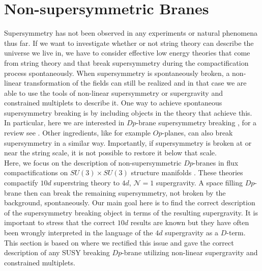 \documentclass[a4paper,12pt,twoside,openright]{report}
\begin{document}
\section{Non-supersymmetric Branes}
\label{sec:nonsusybranessec}
Supersymmetry has not been observed in any experiments or natural phenomena thus far. If we want to investigate whether or not string theory can describe the universe we live in, we have to consider effective low energy theories that come from string theory and that break supersymmetry during the compactification process spontaneously. When supersymmetry is spontaneously broken, a non-linear transformation of the fields can still be realized and in that case we are able to use the tools of non-linear supersymmetry or supergravity and constrained multiplets to describe it. One way to achieve spontaneous supersymmetry breaking is by including objects in the theory that achieve this. In particular, here we are interested in $Dp$-brane supersymmetry breaking \cite{Sugimoto:1999tx,Antoniadis:1999xk,Angelantonj:1999jh,Aldazabal:1999jr,Angelantonj:1999ms,Dudas:2000nv,Pradisi:2001yv}, for a review see \cite{Mourad:2017rrl}. Other ingredients, like for example $Op$-planes, can also break supersymmetry in a similar way. Importantly, if supersymmetry is broken at or near the string scale, it is not possible to restore it below that scale.\\
Here, we focus on the description of non-supersymmetric $Dp$-branes in flux compactifications on $SU(3)\times SU(3)$ structure manifolds \cite{Lust:2008zd}. These theories compactify $10d$ superstring theory to $4d$, $\mathcal{N}=1$ supergravity. A space filling $Dp$-brane then can break the remaining supersymmetry, not broken by the background, spontaneously. Our main goal here is to find the correct description of the supersymmetry breaking object in terms of the resulting supergravity. It is important to stress that the correct $10d$ results are known \cite{Villadoro:2006ia,Blumenhagen:2002wn,Kachru:1999vj,Cvetic:2001nr} but they have often been wrongly interpreted in the language of the $4d$ supergravity as a $D$-term. This section is based on \cite{Cribiori:2020bgt} where we rectified this issue and gave the correct description of any SUSY breaking $Dp$-brane utilizing non-linear supergravity and constrained multiplets.
\end{document}
